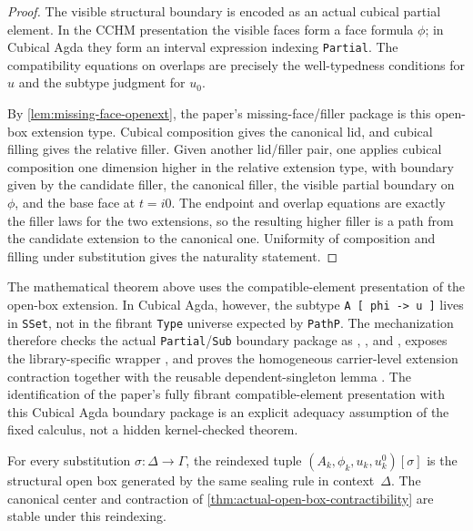 \documentclass{lmcs}
\begin{document}
\begin{proof}
The visible structural boundary is encoded as an actual cubical partial
element. In the CCHM presentation the visible faces form a face formula
$\phi$; in Cubical Agda they form an interval expression indexing
\texttt{Partial}. The compatibility equations on overlaps are precisely the
well-typedness conditions for $u$ and the subtype judgment for $u_0$.

By \autoref{lem:missing-face-openext}, the paper's missing-face/filler package
is this open-box extension type. Cubical composition gives the canonical lid,
and cubical filling gives the relative filler. Given another lid/filler pair,
one applies cubical composition one dimension higher in the relative extension
type, with boundary given by the candidate filler, the canonical filler, the
visible partial boundary on $\phi$, and the base face at $t=i0$. The endpoint
and overlap equations are exactly the filler laws for the two extensions, so
the resulting higher filler is a path from the candidate extension to the
canonical one. Uniformity of composition and filling under substitution gives
the naturality statement.
\end{proof}

\begin{rem}
\label{rem:agda-open-box-boundary}
The mathematical theorem above uses the compatible-element presentation of the
open-box extension. In Cubical Agda, however, the subtype
\texttt{A [ phi -> u ]} lives in \texttt{SSet}, not in the fibrant
\texttt{Type} universe expected by \texttt{PathP}. The mechanization therefore
checks the actual \texttt{Partial}/\texttt{Sub} boundary package as
, , and
, exposes the library-specific wrapper
, and proves the
homogeneous carrier-level extension contraction 
together with the reusable dependent-singleton lemma
. The identification of the paper's fully
fibrant compatible-element presentation with this Cubical Agda boundary
package is an explicit adequacy assumption of the fixed calculus, not a hidden
kernel-checked theorem.
\end{rem}

\begin{lem}
\label{lem:openext-substitution-stability}
For every substitution $\sigma:\Delta\to\Gamma$, the reindexed tuple
$(A_k,\phi_k,u_k,u^0_k)[\sigma]$ is the structural open box generated by the
same sealing rule in context~$\Delta$. The canonical center and contraction
of \autoref{thm:actual-open-box-contractibility} are stable under this
reindexing.
\end{lem}
\end{document}
